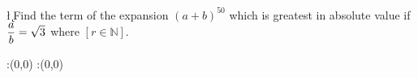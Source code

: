 


\vbtwo\l
\SUBTRACT{}\k 
\question Find the term of the expansion $(a+b)^{50}$ which is greatest in absolute value if $\dfrac{a}{b} = \sqrt{3}$ where $\left[ r \in \mathbb{N} \right]$.

\insertQR{}

\watchout

\ifprintanswers
  \begin{marginfigure}
      :(0,0)
      :(0,0)
    \figdrawbegin{}
      \figdrawline [100,101]
    \figdrawend
    \figvisu{\figBoxA}{}{%
    }
    \centerline{\box\figBoxA}
  \end{marginfigure}
\fi 

